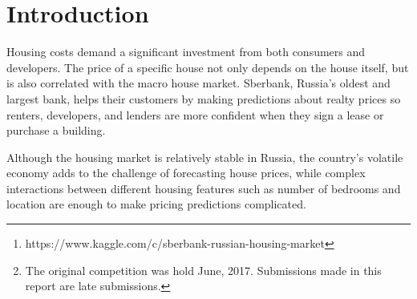 \documentclass{article}
\begin{document}

\begin{abstract}
\textit{Sberbank Russian Housing Market} \footnote{https://www.kaggle.com/c/sberbank-russian-housing-market} \footnote{The original competition was hold June, 2017. Submissions made in this report are late submissions.} is a Kaggle competition estimating deal prices in different transactions of houses. Basic house information, the neighborhood and the region information of the house, and national macro-economy data at time are provided in the dataset.

Preprocessing and feature engineering are hard work in this competition due to the low data quality. Missing values are common, and obvious inconsistencies can be found in the data. The MICE method is applied to fill some of the missing values, and delicate manual work is done for others. XGBoost\cite{xgboost}, a tool kit based on Gradient Boosting Method is applied as the main model, and Several other models are tested as well. A stack strategy for different predicted results is implemented to achieve better performance.
\end{abstract}

\section{Introduction}

Housing costs demand a significant investment from both consumers and developers. The price of a specific house not only depends on the house itself, but is also correlated with the macro house market. Sberbank, Russia’s oldest and largest bank, helps their customers by making predictions about realty prices so renters, developers, and lenders are more confident when they sign a lease or purchase a building.

Although the housing market is relatively stable in Russia, the country’s volatile economy adds to the challenge of forecasting house prices, while complex interactions between different housing features such as number of bedrooms and location are enough to make pricing predictions complicated.
\end{document}
